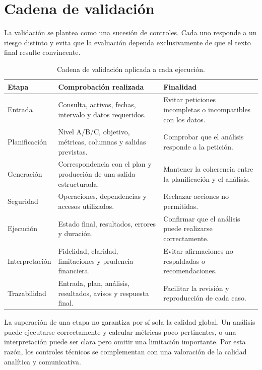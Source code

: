 \section{Cadena de validación}

La validación se plantea como una sucesión de controles. Cada uno responde a un riesgo distinto y evita que la evaluación dependa exclusivamente de que el texto final resulte convincente.

\begin{table}[H]
\centering
\footnotesize
\begin{tabularx}{\textwidth}{p{} p{} X}
\toprule
\textbf{Etapa} & \textbf{Comprobación realizada} & \textbf{Finalidad} \\
\midrule
Entrada & Consulta, activos, fechas, intervalo y datos requeridos. & Evitar peticiones incompletas o incompatibles con los datos. \\
Planificación & Nivel A/B/C, objetivo, métricas, columnas y salidas previstas. & Comprobar que el análisis responde a la petición. \\
Generación & Correspondencia con el plan y producción de una salida estructurada. & Mantener la coherencia entre la planificación y el análisis. \\
Seguridad & Operaciones, dependencias y accesos utilizados. & Rechazar acciones no permitidas. \\
Ejecución & Estado final, resultados, errores y duración. & Confirmar que el análisis puede realizarse correctamente. \\
Interpretación & Fidelidad, claridad, limitaciones y prudencia financiera. & Evitar afirmaciones no respaldadas o recomendaciones. \\
Trazabilidad & Entrada, plan, análisis, resultados, avisos y respuesta final. & Facilitar la revisión y reproducción de cada caso. \\
\bottomrule
\end{tabularx}
\caption{Cadena de validación aplicada a cada ejecución.}
\label{tab:cadena_validacion_metodologia}
\end{table}

La superación de una etapa no garantiza por sí sola la calidad global. Un análisis puede ejecutarse correctamente y calcular métricas poco pertinentes, o una interpretación puede ser clara pero omitir una limitación importante. Por esta razón, los controles técnicos se complementan con una valoración de la calidad analítica y comunicativa.

